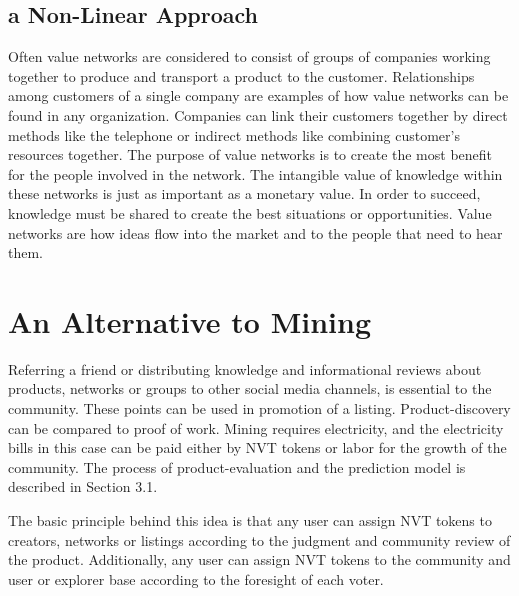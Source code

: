 
\subsection{a Non-Linear Approach}
Often value networks are considered to consist of groups of companies working together to produce and transport a product to the customer. Relationships among customers of a single company are examples of how value networks can be found in any organization. Companies can link their customers together by direct methods like the telephone or indirect methods like combining customer’s resources together. The purpose of value networks is to create the most benefit for the people involved in the network. The intangible value of knowledge within these networks is just as important as a monetary value. In order to succeed, knowledge must be shared to create the best situations or opportunities. Value networks are how ideas flow into the market and to the people that need to hear them.


\section{An Alternative to Mining}

Referring a friend or distributing knowledge and informational reviews about products, networks or groups to other social media channels, is essential to the community. These points can be used in promotion of a listing. Product-discovery can be compared to proof of work. Mining requires electricity, and the electricity bills in this case can be paid either by NVT tokens or labor for the growth of the community. The process of product-evaluation and the prediction model is described in Section 3.1.

The basic principle behind this idea is that any user can assign NVT tokens to creators, networks or listings according to the judgment and community review of the product. Additionally, any user can assign NVT tokens to the community and user or explorer base according to the foresight of each voter.


